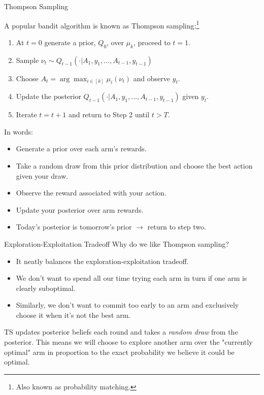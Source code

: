 \documentclass[aspectratio=169,xcolor=dvipsnames]{beamer}
\begin{document}
\begin{frame}{Thompson Sampling}

    A popular bandit algorithm is known as Thompson 
    sampling:\footnote{Also known as probability matching.}
\begin{enumerate}
    \item At $t=0$ generate a prior, $Q_0$, over $\mu_k$, proceed to $t = 1$.
    \item Sample $\nu_t \sim Q_{t-1}(\cdot | A_1, y_1, ..., A_{t-1}, y_{t-1})$
    \item Choose $A_t = \arg\max_{i \in [k]} \mu_i(\nu_t)$ and observe $y_t$.
    \item Update the posterior $Q_{t-1}(\cdot | A_1, y_1, ..., A_{t-1}, y_{t-1})$ given $y_t$.
    \item Iterate $t = t+1$ and return to Step 2 until $t > T$.
\end{enumerate}

\end{frame}


\begin{frame}

    
    In words:

    \begin{itemize}
        \item Generate a prior over each arm's rewards.
        \item Take a random draw from this prior distribution and choose the best action given your draw.
        \item Observe the reward associated with your action.
        \item Update your posterior over arm rewards.
        \item Today's posterior is tomorrow's prior $\rightarrow$ return to step two.
    \end{itemize}

\end{frame}


\begin{frame}{Exploration-Exploitation Tradeoff}
    Why do we like Thompson sampling?

    \begin{itemize}
        \item It neatly balances the exploration-exploitation tradeoff.
        \item We don't want to spend all our time trying each arm in turn if one arm 
        is clearly suboptimal.
        \item Similarly, we don't want to commit too early to an arm and exclusively 
        choose it when it's not the best arm. 
    \end{itemize}

    TS updates posterior beliefs each round and takes a \textit{random draw} from 
    the posterior. This means we will choose to explore another arm over the 
    "currently optimal" arm in proportion to the exact probability we believe it 
    could be optimal.
\end{frame}
\end{document}

